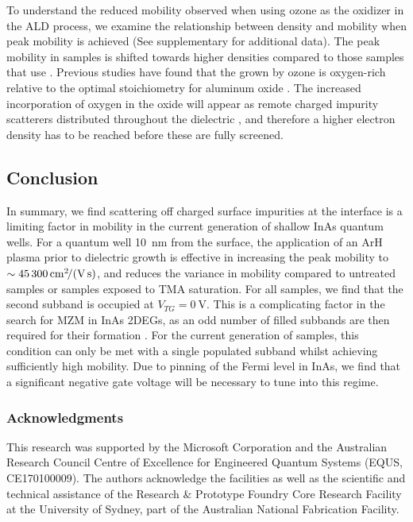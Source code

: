 To understand the reduced mobility observed when using ozone as the oxidizer in the ALD process, we examine the relationship between density and mobility when peak mobility is achieved (See supplementary for additional data). The peak mobility in  samples is shifted towards higher densities compared to those samples that use . Previous studies have found that the  grown by ozone is oxygen-rich relative to the optimal stoichiometry for aluminum oxide \cite{ingaas_redux,10.1021/cm0608903}. The increased incorporation of oxygen in the oxide will appear as remote charged impurity scatterers distributed throughout the dielectric \cite{scattering}, and therefore a higher electron density has to be reached before these are fully screened.

\subsection{Conclusion}
In summary, we find scattering off charged surface impurities at the  interface is a limiting factor in mobility in the current generation of shallow InAs quantum wells. For a quantum well \SI{10}{\nano\meter} from the surface, the application of an ArH plasma prior to dielectric growth is effective in increasing the peak mobility to $\sim \mob{45300}$, and reduces the variance in mobility compared to untreated samples or samples exposed to TMA saturation. For all samples, we find that the second subband is occupied at $V_{TG} = \SI{0}{\volt}$. This is a complicating factor in the search for MZM in InAs 2DEGs, as an odd number of filled subbands are then required for their formation  \cite{s41578-018-0003-1}. For the current generation of samples, this condition can only be met with a single populated subband whilst achieving sufficiently high mobility. Due to pinning of the Fermi level in InAs, we find that a significant negative gate voltage will be necessary to tune into this regime.

\subsubsection{Acknowledgments}
This research was supported by the Microsoft Corporation and the Australian Research Council Centre of Excellence for Engineered Quantum Systems (EQUS, CE170100009). The authors acknowledge the facilities as well as the scientific and technical assistance of the Research \& Prototype Foundry Core Research Facility at the University of Sydney, part of the Australian National Fabrication Facility.